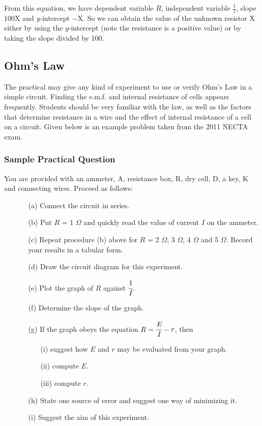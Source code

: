 From this equation, we have dependent variable $R$, independent variable $\frac{1}{l}$, slope $100 \text{X}$ and $y$-intercept $-\text{X}$. So we can obtain the value of the unknown resistor X either by using the $y$-intercept (note the resistance is a positive value) or by taking the slope divided by 100.

\subsection{Ohm’s Law}  

The practical may give any kind of experiment to use or verify Ohm’s Law in a
simple circuit. Finding the e.m.f. and internal resistance of cells appears frequently. Students should be very familiar with the law, as well as the factors that determine resistance in a wire and the effect of internal resistance of a cell on a circuit. Given below is an example problem taken from the 2011 NECTA exam.

\subsubsection{Sample Practical Question}
You are provided with an ammeter, A, resistance box, R, dry cell, D, a key, K and connecting wires. Proceed as follows:
\begin{enumerate}
\item[]
\begin{enumerate}
\item[(a)] Connect the circuit in series.
\item[(b)] Put $R$ = 1 $\Omega$ and quickly read the value of current $I$ on the ammeter.
\item[(c)] Repeat procedure (b) above for $R$ = 2 $\Omega$, 3 $\Omega$, 4 $\Omega$ and 5 $\Omega$. Record your results in a tabular form.
\item[(d)] Draw the circuit diagram for this experiment.
\item[(e)] Plot the graph of $R$ against $\cfrac{1}{I}$.
\item[(f)] Determine the slope of the graph.
\item[(g)] If the graph obeys the equation $R=\cfrac{E}{I}-r$, then
\begin{enumerate}
\item[(i)] suggest how $E$ and $r$ may be evaluated from your graph.
\item[(ii)] compute $E$.
\item[(iii)] compute $r$.
\end{enumerate}
\item[(h)] State one source of error and suggest one way of minimizing it.
\item[(i)] Suggest the aim of this experiment.
\end{enumerate}
\end{enumerate}

